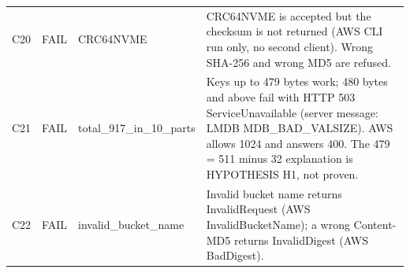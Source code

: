 \begin{tabular}{@{}lp{2.0cm}p{3.6cm}p{7.0cm}@{}}
C20 & FAIL & CRC64NVME & CRC64NVME is accepted but the checksum is not returned (AWS CLI run only, no second client). Wrong SHA-256 and wrong MD5 are refused. \\
C21 & FAIL & total\_917\_in\_10\_parts & Keys up to 479 bytes work; 480 bytes and above fail with HTTP 503 ServiceUnavailable (server message: LMDB MDB\_BAD\_VALSIZE). AWS allows 1024 and answers 400. The 479 = 511 minus 32 explanation is HYPOTHESIS H1, not proven. \\
C22 & FAIL & invalid\_bucket\_name & Invalid bucket name returns InvalidRequest (AWS InvalidBucketName); a wrong Content-MD5 returns InvalidDigest (AWS BadDigest). \\
\bottomrule
\end{tabular}
